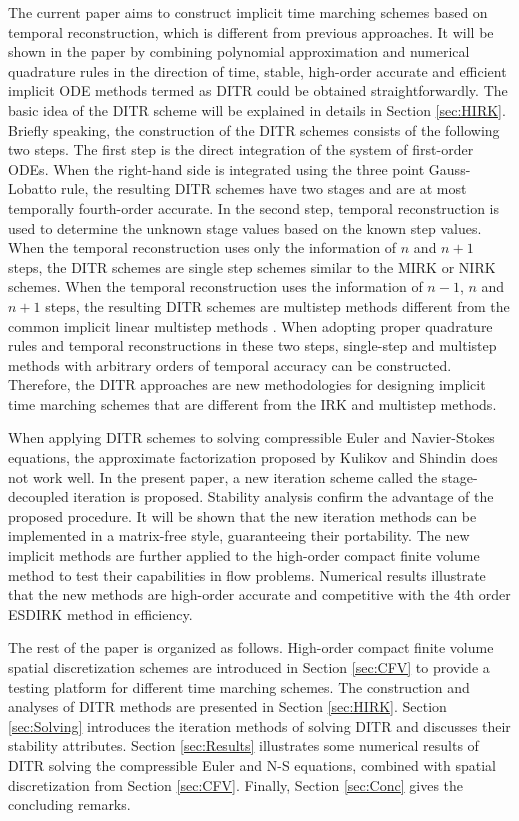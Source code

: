 The current paper aims to construct implicit
time marching schemes based on temporal
reconstruction, which is different from previous approaches.
It will be shown in the paper by combining polynomial approximation and
numerical quadrature rules in the direction of time,
stable,
high-order accurate and efficient implicit ODE methods
termed as DITR could be
obtained straightforwardly.
The basic idea of the DITR scheme will be explained in details
in Section \ref{sec:HIRK}.
Briefly speaking, the construction of the DITR
schemes consists of the following two steps.
The first step is the direct integration of the
system of first-order ODEs.
When the right-hand side is integrated using the
three point Gauss-Lobatto rule, the resulting DITR
schemes have two stages and are at most temporally fourth-order accurate.
In the second step, temporal reconstruction is used to determine the 
unknown stage values based on the known step values.
When the temporal reconstruction uses only the information of $n$
and $n+1$ steps, the DITR schemes are single step schemes
similar to the MIRK or NIRK schemes.
When the temporal reconstruction uses the information of $n-1$, $n$ and $n+1$ steps,
the resulting DITR schemes are multistep methods
different from the common implicit linear multistep
methods \cite{wanner1996solving}.
When adopting proper quadrature rules
and temporal reconstructions in these two steps, single-step
and multistep methods with arbitrary orders of temporal
accuracy can be constructed. Therefore, the DITR approaches
are new methodologies for designing implicit time marching
schemes that are different from the IRK and multistep
methods.

When applying DITR schemes to solving compressible Euler and
Navier-Stokes equations, the approximate factorization
proposed by Kulikov and Shindin \cite{kulikov2007asymptotic}
does not work well.
In the present paper,
a new iteration scheme called the stage-decoupled iteration
is proposed.
Stability analysis
confirm the advantage of the proposed procedure.
It will be shown that the new iteration methods can be implemented
in a matrix-free style, guaranteeing their portability.
The new implicit methods are further applied to the
high-order compact finite volume method \cite{wang2017compact_VR} to
test their capabilities in flow problems. Numerical results
illustrate that the new methods are high-order accurate
and competitive with the 4th order ESDIRK method in efficiency.

The rest of the paper is organized as follows.
High-order compact finite volume spatial discretization schemes
are introduced in Section \ref{sec:CFV} to provide a testing platform for 
different time marching schemes.
The construction and analyses of DITR methods are presented
in Section \ref{sec:HIRK}.
Section \ref{sec:Solving} introduces the iteration methods
of solving DITR and discusses their stability attributes.
Section \ref{sec:Results} illustrates some numerical results of
DITR solving the compressible Euler and N-S equations, combined with
spatial discretization from Section \ref{sec:CFV}.
Finally, Section \ref{sec:Conc} gives the concluding remarks.


